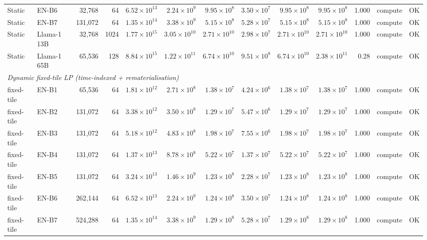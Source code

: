 \begin{table}[ht!]
{\begin{tabular}{llrrrrrrrrrll}
Static & EN-B6       &  32{,}768 &   64 & $6.52\times10^{13}$ & $2.24\times10^{9}$  & $9.95\times10^{8}$ & $3.50\times10^{7}$ & $9.95\times10^{8}$ & $9.95\times10^{8}$ & 1.000 & compute & OK \\
Static & EN-B7       & 131{,}072 &   64 & $1.35\times10^{14}$ & $3.38\times10^{9}$  & $5.15\times10^{8}$ & $5.28\times10^{7}$ & $5.15\times10^{8}$ & $5.15\times10^{8}$ & 1.000 & compute & OK \\
Static & Llama-1 13B &  32{,}768 & 1024 & $1.77\times10^{15}$ & $3.05\times10^{10}$ & $2.71\times10^{10}$& $2.98\times10^{7}$ & $2.71\times10^{10}$& $2.71\times10^{10}$& 1.000 & compute & OK \\
Static & Llama-1 65B &  65{,}536 &  128 & $8.84\times10^{15}$ & $1.22\times10^{11}$ & $6.74\times10^{10}$& $9.51\times10^{8}$ & $6.74\times10^{10}$& $2.38\times10^{11}$& 0.28 & compute & OK \\
\midrule
\multicolumn{13}{l}{\textit{Dynamic fixed-tile LP (time-indexed + rematerialisation)}} \\
\midrule
fixed-tile & EN-B1       &  65{,}536 &  64 & $1.81\times10^{12}$ & $2.71\times10^{8}$  & $1.38\times10^{7}$ & $4.24\times10^{6}$ & $1.38\times10^{7}$ & $1.38\times10^{7}$ & 1.000 & compute & OK \\
fixed-tile & EN-B2       & 131{,}072 &  64 & $3.38\times10^{12}$ & $3.50\times10^{8}$  & $1.29\times10^{7}$ & $5.47\times10^{6}$ & $1.29\times10^{7}$ & $1.29\times10^{7}$ & 1.000 & compute & OK \\
fixed-tile & EN-B3       & 131{,}072 &  64 & $5.18\times10^{12}$ & $4.83\times10^{8}$  & $1.98\times10^{7}$ & $7.55\times10^{6}$ & $1.98\times10^{7}$ & $1.98\times10^{7}$ & 1.000 & compute & OK \\
fixed-tile & EN-B4       & 131{,}072 &  64 & $1.37\times10^{13}$ & $8.78\times10^{8}$  & $5.22\times10^{7}$ & $1.37\times10^{7}$ & $5.22\times10^{7}$ & $5.22\times10^{7}$ & 1.000 & compute & OK \\
fixed-tile & EN-B5       & 131{,}072 &  64 & $3.24\times10^{13}$ & $1.46\times10^{9}$  & $1.23\times10^{8}$ & $2.28\times10^{7}$ & $1.23\times10^{8}$ & $1.23\times10^{8}$ & 1.000 & compute & OK \\
fixed-tile & EN-B6       & 262{,}144 &  64 & $6.52\times10^{13}$ & $2.24\times10^{9}$  & $1.24\times10^{8}$ & $3.50\times10^{7}$ & $1.24\times10^{8}$ & $1.24\times10^{8}$ & 1.000 & compute & OK \\
fixed-tile & EN-B7       & 524{,}288 &  64 & $1.35\times10^{14}$ & $3.38\times10^{9}$  & $1.29\times10^{8}$ & $5.28\times10^{7}$ & $1.29\times10^{8}$ & $1.29\times10^{8}$ & 1.000 & compute & OK \\

\end{tabular}}
\end{table}
